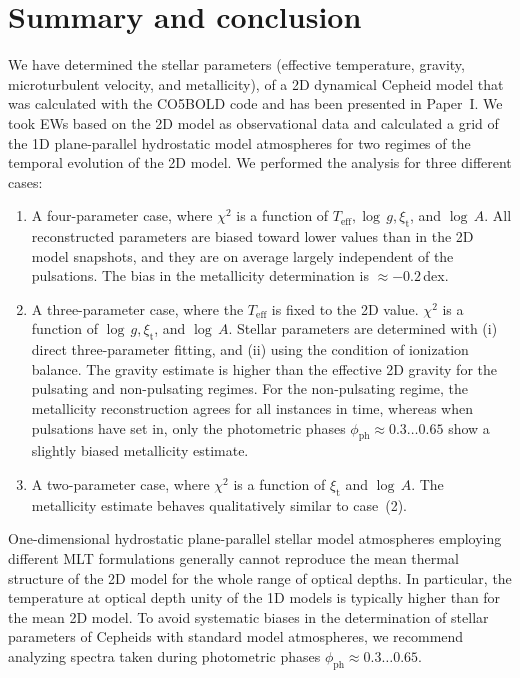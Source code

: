 \documentclass{aa}
\begin{document}
\section{Summary and conclusion}
We have determined the stellar parameters (effective temperature,
gravity, microturbulent velocity, and metallicity),  of a 2D dynamical Cepheid model that was  calculated with the CO5BOLD code and has been presented 
in Paper~I.  
We took EWs based on the 2D model as observational data and
calculated a grid of 
the 1D plane-parallel hydrostatic model atmospheres for two regimes of the 
temporal evolution of the 2D model. We performed the
analysis  for three different cases: 
\begin{enumerate}
\item  A four-parameter case, where $\chi^2$ is a function of
  $T_\mathrm{eff}, \log\,g, \xi_\mathrm{t}$, and  $\log\,A$.  All reconstructed
  parameters are biased toward lower values than in the 2D model
  snapshots, and they are on average largely independent of the pulsations. The bias in
  the metallicity determination is $\approx -0.2$\,dex.

\item A three-parameter case, where the $T_\mathrm{eff}$ is fixed 
to the 2D value. $\chi^2$ is a function of
$\log\,g, \xi_\mathrm{t}$,  and  $\log\,A$.  Stellar parameters are determined with (i)
direct three-parameter fitting, and (ii) using the condition of ionization balance. 
The gravity estimate is higher than the effective 2D gravity for the
pulsating and non-pulsating regimes.  For the non-pulsating regime, the metallicity reconstruction agrees for all instances in time, whereas when
pulsations have set in, only the photometric phases  $\phi_\mathrm{ph}\approx 0.3
\ldots 0.65$ show a slightly biased metallicity estimate. 

\item A two-parameter case, where  $\chi^2$ is a function of
$\xi_\mathrm{t}$ and $\log\,A$. The metallicity estimate behaves
  qualitatively  similar to case~(2). 
\end{enumerate}

One-dimensional hydrostatic plane-parallel stellar model atmospheres employing different
MLT formulations generally cannot reproduce the mean thermal
structure of the 2D model for the whole range of optical depths. In
particular, the temperature at optical depth unity of the 1D models is typically higher than for
the mean 2D model. To avoid systematic biases in the determination of stellar
parameters of Cepheids with standard model atmospheres, we recommend analyzing
spectra taken during photometric phases $\phi_\mathrm{ph}\approx 0.3 \ldots
0.65$.
\end{document}
